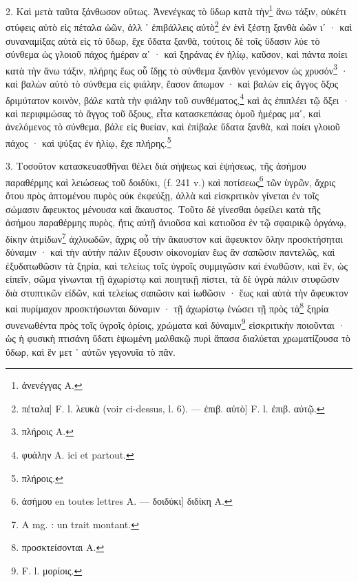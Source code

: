 \documentclass[a4paper, 11pt, oneside, polutonikogreek, french]{article}
\begin{document}
2. Καὶ μετὰ ταῦτα ξάνθωσον οὕτως. Ἀνενέγκας τὸ ὕδωρ κατὰ τὴν\footnote{ἀνενέγγας A.} ἄνω τάξιν, οὐκέτι στύφεις αὐτὸ εἰς πέταλα ὠῶν, ἀλλ ᾽ ἐπιβάλλεις αὐτὸ\footnote{πέταλα] F. l. λευκὰ (voir ci-dessus, l. 6). --- ἐπιβ. αὐτὸ] F. l. ἐπιβ. αὐτῷ.} ἐν ἑνὶ ξέστῃ ξανθὰ ὠῶν ιʹ · καὶ συναναμίξας αὐτὰ εἰς τὸ ὕδωρ, ἔχε ὕδατα ξανθὰ, τούτοις δὲ τοῖς ὕδασιν λύε τὸ σύνθεμα ὡς γλοιοῦ πάχος ἡμέραν αʹ · καὶ ξηράνας ἐν ἡλίῳ, καῦσον, καὶ πάντα ποίει κατὰ τὴν ἄνω τάξιν, πλήρης ἕως οὗ ἴδῃς τὸ σύνθεμα ξανθὸν γενόμενον ὡς χρυσόν\footnote{πλήροις A.} · καὶ βαλὼν αὐτὸ τὸ σύνθεμα εἰς φιάλην, ἔασον ἄπωμον · καὶ βαλὼν εἰς ἄγγος ὄξος δριμύτατον κοινὸν, βάλε κατὰ τὴν φιάλην τοῦ συνθέματος,\footnote{φυάλην A. ici et partout.} καὶ ἀς ἐπιπλέει τῷ ὄξει · καὶ περιφιμώσας τὸ ἄγγος τοῦ ὄξους, εἶτα κατασκεπάσας ὁμοῦ ἡμέρας μαʹ, καὶ ἀνελόμενος τὸ σύνθεμα, βάλε εἰς θυείαν, καὶ ἐπίβαλε ὕδατα ξανθὰ, καὶ ποίει γλοιοῦ πάχος · καὶ ψύξας ἐν ἡλίῳ, ἔχε πλήρης.\footnote{πλήροις.}

3. Τοσοῦτον κατασκευασθῆναι θέλει διὰ σήψεως καὶ ἑψήσεως, τῆς ἀσήμου παραθέρμης καὶ λειώσεως τοῦ δοιδύκι, (f. 241 v.) καὶ ποτίσεως\footnote{ἀσήμου en toutes lettres A. --- δοιδύκι] διδίκη A.} τῶν ὑγρῶν, ἄχρις ὅτου πρὸς ἀπτομένου πυρὸς οὐκ ἐκφεύξῃ, ἀλλὰ καὶ εἰσκριτικὸν γίνεται ἐν τοῖς σώμασιν ἄφευκτος μένουσα καὶ ἄκαυστος. Τοῦτο δὲ γίνεσθαι ὀφείλει κατὰ τῆς ἀσήμου παραθέρμης πυρὸς, ἥτις αὐτῇ ἀνιοῦσα καὶ κατιοῦσα ἐν τῷ σφαιρικῷ ὀργάνῳ, δίκην ἀτμίδων\footnote{A mg. : un trait montant.} ἀχλυωδῶν, ἄχρις οὗ τὴν ἄκαυστον καὶ ἄφευκτον ὅλην προσκτήσηται δύναμιν · καὶ τὴν αὐτὴν πάλιν ἔξουσιν οἰκονομίαν ἕως ἂν σαπῶσιν παντελῶς, καὶ ἐξυδατωθῶσιν τὰ ξηρία, καὶ τελείως τοῖς ὑγροῖς συμμιγῶσιν καὶ ἑνωθῶσιν, καὶ ἓν, ὡς εἰπεῖν, σῶμα γίνωνται τῇ ἀχωρίστῳ καὶ ποιητικῇ πίστει, τὰ δὲ ὑγρὰ πάλιν στυφῶσιν διὰ στυπτικῶν εἰδῶν, καὶ τελείως σαπῶσιν καὶ ἰωθῶσιν · ἕως καὶ αὐτὰ τὴν ἄφευκτον καὶ πυρίμαχον προσκτήσωνται δύναμιν · τῇ ἀχωρίστῳ ἑνώσει τῇ πρὸς τὰ\footnote{προσκτείσονται A.} ξηρία συνενωθέντα πρὸς τοῖς ὑγροῖς ὁρίοις, χρώματα καὶ δύναμιν\footnote{F. l. μορίοις.} εἰσκριτικὴν ποιοῦνται · ὡς ἡ φυσικὴ πτισάνη ὕδατι ἑψωμένη μαλθακῷ πυρὶ ἅπασα διαλύεται χρωματίζουσα τὸ ὕδωρ, καὶ ἓν μετ ᾽ αὐτῶν γεγονυῖα τὸ πᾶν.
\end{document}
